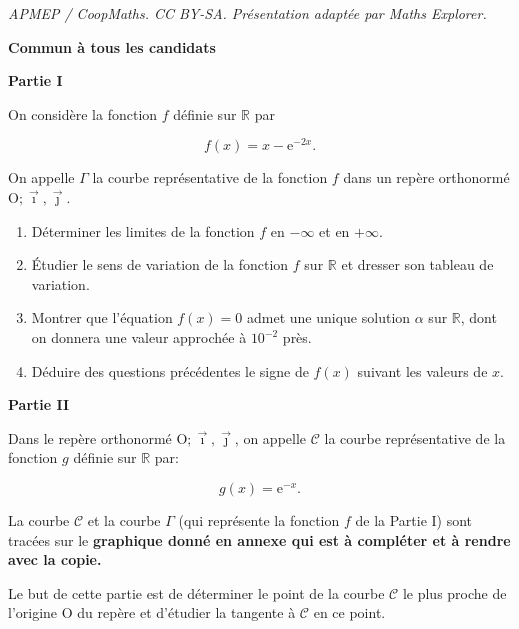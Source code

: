 \documentclass[10pt]{article}
\providecommand{\R}{\mathbb{R}}
\providecommand{\Oij}{\(\mathrm{O};\vec{\imath},\vec{\jmath}\)}
\begin{document}
\noindent\textit{APMEP / CoopMaths. CC BY-SA. Présentation adaptée par Maths Explorer.}\par\medskip
\textbf{Commun à tous les candidats}

\medskip

\begin{center}\textbf{Partie I}\end{center}

On considère la fonction $f$ définie sur $\R$ par 

\[f(x) = x - \text{e}^{-2x}.\]

On appelle $\Gamma$ la courbe représentative de la fonction $f$ dans un repère orthonormé \Oij.

\medskip

\begin{enumerate}
\item Déterminer les limites de la fonction $f$ en $- \infty$ et en $+ \infty$.
\item Étudier le sens de variation de la fonction $f$ sur $\R$ et dresser son tableau de variation.
\item Montrer que l'équation $f(x) = 0$ admet une unique solution $\alpha$ sur $\R$, dont on donnera une valeur approchée à $10^{-2}$ près.
\item Déduire des questions précédentes le signe de $f(x)$ suivant les valeurs de $x$.
\end{enumerate}

\begin{center}\textbf{Partie II}\end{center}


Dans le repère orthonormé \Oij, on appelle $\mathcal{C}$ la courbe représentative de la fonction $g$ définie sur $\R$ par:

\[g(x) = \text{e}^{-x}.\]

 La courbe $\mathcal{C}$ et la courbe $\Gamma$ (qui représente la fonction $f$ de la Partie I) sont tracées sur le \textbf{graphique donné en annexe qui est à compléter et à rendre avec la copie.}

\smallskip

Le but de cette partie est de déterminer le point de la courbe $\mathcal{C}$ le plus proche de l'origine O du repère et d'étudier la tangente à $\mathcal{C}$ en ce point.

\medskip
\end{document}
